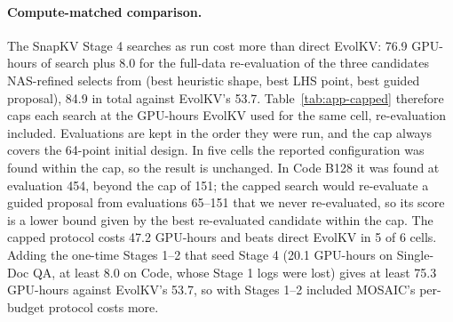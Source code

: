 \paragraph{Compute-matched comparison.} The SnapKV Stage 4 searches as run cost more than direct EvolKV: 76.9 GPU-hours of search plus 8.0 for the full-data re-evaluation of the three candidates NAS-refined selects from (best heuristic shape, best LHS point, best guided proposal), 84.9 in total against EvolKV's 53.7. Table~\ref{tab:app-capped} therefore caps each search at the GPU-hours EvolKV used for the same cell, re-evaluation included. Evaluations are kept in the order they were run, and the cap always covers the 64-point initial design. In five cells the reported configuration was found within the cap, so the result is unchanged. In Code B128 it was found at evaluation 454, beyond the cap of 151; the capped search would re-evaluate a guided proposal from evaluations 65--151 that we never re-evaluated, so its score is a lower bound given by the best re-evaluated candidate within the cap. The capped protocol costs 47.2 GPU-hours and beats direct EvolKV in 5 of 6 cells. Adding the one-time Stages 1--2 that seed Stage 4 (20.1 GPU-hours on Single-Doc QA, at least 8.0 on Code, whose Stage 1 logs were lost) gives at least 75.3 GPU-hours against EvolKV's 53.7, so with Stages 1--2 included MOSAIC's per-budget protocol costs more.

